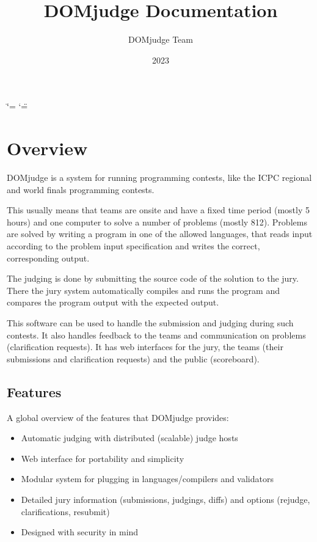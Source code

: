 \documentclass[a4paper,10pt,english,openany]{sphinxmanual}
\title{DOMjudge Documentation}
\date{2023}
\author{DOMjudge Team}
\begin{document}
\ifdefined\shorthandoff
  \ifnum\catcode`\=\string=\active\shorthandoff{=}\fi
  \ifnum\catcode`\"=\active{}\fi
\fi

\pagestyle{empty}

\pagestyle{plain}

\pagestyle{normal}
\label{\detokenize{index::doc}}


\sphinxstepscope


\section{Overview}
\label{\detokenize{overview:overview}}\label{\detokenize{overview::doc}}
\sphinxAtStartPar
DOMjudge is a system for running programming contests, like the ICPC
regional and world finals programming contests.

\sphinxAtStartPar
This usually means that teams are on\sphinxhyphen{}site and have a fixed time period (mostly
5 hours) and one computer to solve a number of problems (mostly 8\sphinxhyphen{}12). Problems
are solved by writing a program in one of the allowed languages, that reads
input according to the problem input specification and writes the correct,
corresponding output.

\sphinxAtStartPar
The judging is done by submitting the source code of the solution to the jury.
There the jury system automatically compiles and runs the program and compares
the program output with the expected output.

\sphinxAtStartPar
This software can be used to handle the submission and judging during such
contests. It also handles feedback to the teams and communication on problems
(clarification requests). It has web interfaces for the jury, the teams (their
submissions and clarification requests) and the public (scoreboard).


\subsection{Features}
\label{\detokenize{overview:features}}
\sphinxAtStartPar
A global overview of the features that DOMjudge provides:
\begin{itemize}
\item {} 
\sphinxAtStartPar
Automatic judging with distributed (scalable) judge hosts

\item {} 
\sphinxAtStartPar
Web interface for portability and simplicity

\item {} 
\sphinxAtStartPar
Modular system for plugging in languages/compilers and validators

\item {} 
\sphinxAtStartPar
Detailed jury information (submissions, judgings, diffs)
and options (rejudge, clarifications, resubmit)

\item {} 
\sphinxAtStartPar
Designed with security in mind

\end{itemize}
\end{document}
